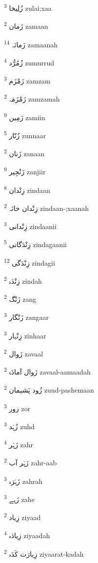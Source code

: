 \documentclass[12pt]{article}
\begin{document}
\begin{RTL}
\begin{multicols}{5}
{\ur زُلِیخا}   \textsuperscript{3} zulai;xaa

{\ur زَمان}   \textsuperscript{2} zamaan

{\ur زَمانَہ}   \textsuperscript{14} zamaanah

{\ur زُمُرُّد}   \textsuperscript{4} zumurrud

{\ur زَمْزَم}   \textsuperscript{3} zamzam

{\ur زَمْزَمَہ}   \textsuperscript{2} zamzamah

{\ur زَمِین}   \textsuperscript{9} zamiin

{\ur زُنّار}   \textsuperscript{5} zunnaar

{\ur زَنان}   \textsuperscript{2} zanaan

{\ur زَنْجِیر}   \textsuperscript{9} zanjiir

{\ur زِنْدان}   \textsuperscript{8} zindaan

{\ur زِنْدان خانَہ}   \textsuperscript{2} zindaan-;xaanah

{\ur زِنْدانی}   \textsuperscript{3} zindaanii

{\ur زِنْدَگانی}   \textsuperscript{5} zindagaanii

{\ur زِنْدَگی}   \textsuperscript{12} zindagii

{\ur زِنْدَہ}   \textsuperscript{2} zindah

{\ur زَنْگ}   \textsuperscript{2} zang

{\ur زَنْگار}   \textsuperscript{3} zangaar

{\ur زِنْہار}   \textsuperscript{3} zinhaar

{\ur زَوال}   \textsuperscript{2} zavaal

{\ur زَوال آمادَہ}   \textsuperscript{2} zavaal-aamaadah

{\ur زُود پَشیمان}   \textsuperscript{2} zuud-pashemaan

{\ur زور}   \textsuperscript{3} zor

{\ur زُہْد}   \textsuperscript{3} zuhd

{\ur زَہْر}   \textsuperscript{4} zahr

{\ur زَہْر آب}   \textsuperscript{2} zahr-aab

{\ur زَہْرَہ}   \textsuperscript{3} zahrah

{\ur زَہے}   \textsuperscript{3} zahe

{\ur زِیاد}   \textsuperscript{2} ziyaad

{\ur زِیادَہ}   \textsuperscript{4} ziyaadah

{\ur زِیارَت کَدَہ}   \textsuperscript{2} ziyaarat-kadah


\end{multicols}
\end{RTL}
\end{document}
